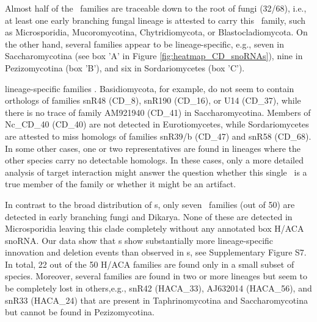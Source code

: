 Almost half of the \cd\ families are traceable down to the root of fungi
(32/68), i.e., at least one early branching fungal lineage is attested to
carry this \sno\ family, such as Microsporidia, Mucoromycotina,
Chytridiomycota, or Blastocladiomycota. On the other hand, several families
appear to be lineage-specific, e.g., seven in Saccharomycotina (see box 'A'
in Figure \ref{fig:heatmap_CD_snoRNAs}), nine in Pezizomycotina (box 'B'),
and six in Sordariomycetes (box 'C').

 lineage-specific families . Basidiomycota, for example, do not
seem to contain orthologs of families snR48 (CD\_8), snR190 (CD\_16), or
U14 (CD\_37), while there is no trace of family AM921940 (CD\_41) in
Saccharomycotina. Members of Nc\_CD\_40 (CD\_40) are not detected in
Eurotiomycetes, while Sordariomycetes are attested to miss homologs of
families snR39/b (CD\_47) and snR58 (CD\_68). In some other cases, one or
two representatives are found in lineages where the other species carry no
detectable homologs. In these cases, only a more detailed analysis of
target interaction might answer the question whether this single \sno\ is a
true member of the family or whether it might be an artifact.

In contrast to the broad distribution of \cd s, only seven \haca\
families (out of 50) are detected in early branching fungi and
Dikarya. None of these are detected in Microsporidia leaving this
clade completely without any annotated box H/ACA snoRNA. Our data show
that \haca s show substantially more lineage-specific innovation and
deletion events than observed in \cd s, see Supplementary Figure
S7. In total, 22 out of the 50 H/ACA families are found only in a
small subset of species. Moreover, several families are found in two
or more lineages but seem to be completely lost in others,e.g.,
snR42 (HACA\_33), AJ632014 (HACA\_56), and snR33 (HACA\_24) that are
present in Taphrinomycotina and Saccharomycotina but cannot be found
in Pezizomycotina.

